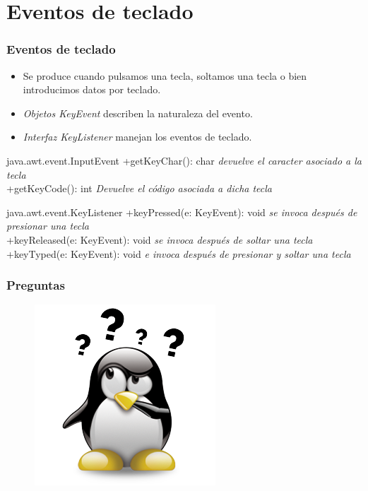 \documentclass{beamer}
\begin{document}
\section{Eventos de teclado}
\begin{frame}[fragile]
\frametitle{Eventos de teclado}
\begin{itemize}[<+->]
\item Se produce cuando pulsamos una tecla, soltamos una tecla o bien introducimos datos por teclado.
\item \emph{Objetos KeyEvent} describen la naturaleza del evento.
\item \emph{Interfaz KeyListener} manejan los eventos de teclado.
\end{itemize}
\pause
\begin{block}{java.awt.event.InputEvent}
+getKeyChar(): char \emph{devuelve el caracter asociado a la tecla}\\
+getKeyCode(): int \emph{Devuelve el código asociada a dicha tecla}
\end{block}
\pause
\begin{block}{java.awt.event.KeyListener}
+keyPressed(e: KeyEvent): void \emph{se invoca después de presionar una tecla}\\
+keyReleased(e: KeyEvent): void \emph{se invoca después de soltar una tecla}\\
+keyTyped(e: KeyEvent): void \emph{e invoca después de presionar y soltar una tecla}
\end{block}
\end{frame}

\begin{frame}
\frametitle{Preguntas} 
\begin{figure}
\includegraphics[scale=0.9]{imagenes/dudas.png} 
\end{figure} 
\end{frame}
\end{document}
